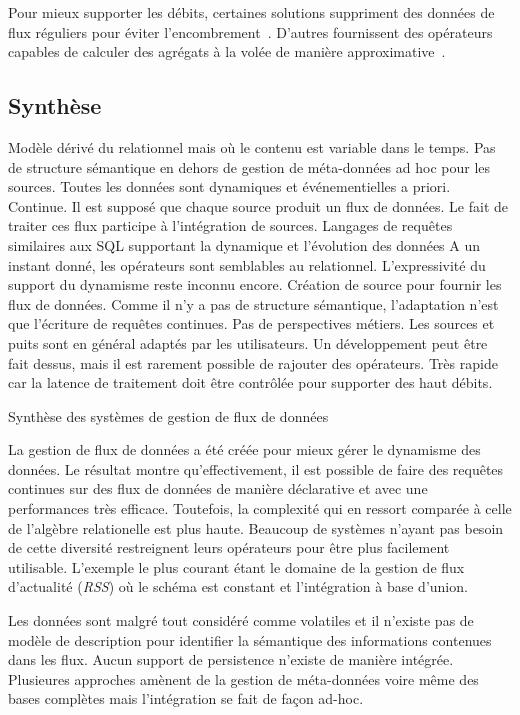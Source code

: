 Pour mieux supporter les débits, certaines solutions suppriment des données de flux réguliers pour éviter l'encombrement~\cite{Tatbul:load-shedding}. D'autres fournissent des opérateurs capables de calculer des agrégats à la volée de manière approximative~\cite{Babcock:sampling}.

\subsection{Synthèse}
\begin{table}[!ht]
\criteretabDonnee
    {Modèle dérivé du relationnel mais où le contenu est variable dans le temps.}
    {Pas de structure sémantique en dehors de gestion de méta-données ad hoc pour les sources.}
    {Toutes les données sont dynamiques et événementielles a priori.}
\criteretabTraitement
    {Continue.}
    {Il est supposé que chaque source produit un flux de données. Le fait de traiter ces flux participe à l'intégration de sources.}
    {Langages de requêtes similaires aux SQL supportant la dynamique et l'évolution des données}
    {A un instant donné, les opérateurs sont semblables au relationnel. L'expressivité du support du dynamisme reste inconnu encore.}
\criteretabAdaptabilite
    {Création de source pour fournir les flux de données. Comme il n'y a pas de structure sémantique, l'adaptation n'est que l'écriture de requêtes continues.}
    {Pas de perspectives métiers.}
    {Les sources et puits sont en général adaptés par les utilisateurs. Un développement peut être fait dessus, mais il est rarement possible de rajouter des opérateurs.}
    {Très rapide car la latence de traitement doit être contrôlée pour supporter des haut débits.}
\caption{Synthèse des systèmes de gestion de flux de données}\label{tab:rw:supervision:sgfd:synthese}
\end{table}

La gestion de flux de données a été créée pour mieux gérer le dynamisme des données. Le résultat montre qu'effectivement, il est possible de faire des requêtes continues sur des flux de données de manière déclarative et avec une performances très efficace. Toutefois, la complexité qui en ressort comparée à celle de l'algèbre relationelle est plus haute. Beaucoup de systèmes n'ayant pas besoin de cette diversité restreignent leurs opérateurs pour être plus facilement utilisable. L'exemple le plus courant étant le domaine de la gestion de flux d'actualité (\textit{RSS}) où le schéma est constant et l'intégration à base d'union.

Les données sont malgré tout considéré comme volatiles et il n'existe pas de modèle de description pour identifier la sémantique des informations contenues dans les flux. Aucun support de persistence n'existe de manière intégrée. Plusieures approches amènent de la gestion de méta-données voire même des bases complètes mais l'intégration se fait de façon ad-hoc.
